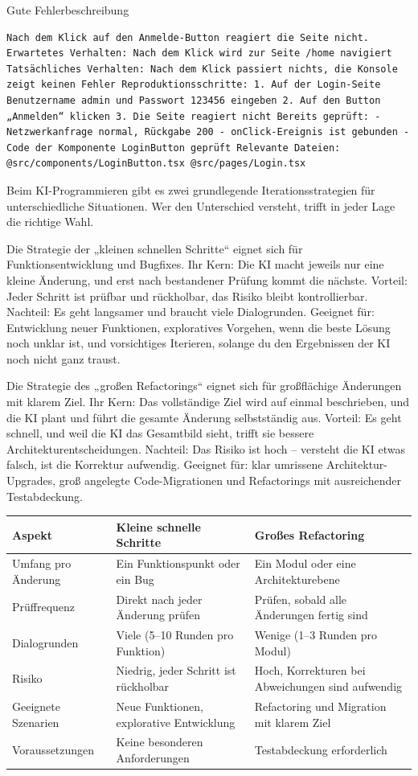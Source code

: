 Gute Fehlerbeschreibung

\begin{lstlisting}
Nach dem Klick auf den Anmelde-Button reagiert die Seite nicht. Erwartetes Verhalten: Nach dem Klick wird zur Seite /home navigiert Tatsächliches Verhalten: Nach dem Klick passiert nichts, die Konsole zeigt keinen Fehler Reproduktionsschritte: 1. Auf der Login-Seite Benutzername admin und Passwort 123456 eingeben 2. Auf den Button „Anmelden“ klicken 3. Die Seite reagiert nicht Bereits geprüft: - Netzwerkanfrage normal, Rückgabe 200 - onClick-Ereignis ist gebunden - Code der Komponente LoginButton geprüft Relevante Dateien: @src/components/LoginButton.tsx @src/pages/Login.tsx
\end{lstlisting}


Beim KI-Programmieren gibt es zwei grundlegende Iterationsstrategien für unterschiedliche Situationen. Wer den Unterschied versteht, trifft in jeder Lage die richtige Wahl.

Die Strategie der „kleinen schnellen Schritte“ eignet sich für Funktionsentwicklung und Bugfixes. Ihr Kern: Die KI macht jeweils nur eine kleine Änderung, und erst nach bestandener Prüfung kommt die nächste. Vorteil: Jeder Schritt ist prüfbar und rückholbar, das Risiko bleibt kontrollierbar. Nachteil: Es geht langsamer und braucht viele Dialogrunden. Geeignet für: Entwicklung neuer Funktionen, exploratives Vorgehen, wenn die beste Lösung noch unklar ist, und vorsichtiges Iterieren, solange du den Ergebnissen der KI noch nicht ganz traust.

Die Strategie des „großen Refactorings“ eignet sich für großflächige Änderungen mit klarem Ziel. Ihr Kern: Das vollständige Ziel wird auf einmal beschrieben, und die KI plant und führt die gesamte Änderung selbstständig aus. Vorteil: Es geht schnell, und weil die KI das Gesamtbild sieht, trifft sie bessere Architekturentscheidungen. Nachteil: Das Risiko ist hoch – versteht die KI etwas falsch, ist die Korrektur aufwendig. Geeignet für: klar umrissene Architektur-Upgrades, groß angelegte Code-Migrationen und Refactorings mit ausreichender Testabdeckung.

\begin{center}
\begin{tabularx}{\linewidth}{|X|X|X|}
\hline
\textbf{Aspekt} & \textbf{Kleine schnelle Schritte} & \textbf{Großes Refactoring} \tabularnewline
\hline
Umfang pro Änderung & Ein Funktionspunkt oder ein Bug & Ein Modul oder eine Architekturebene \tabularnewline
Prüffrequenz & Direkt nach jeder Änderung prüfen & Prüfen, sobald alle Änderungen fertig sind \tabularnewline
Dialogrunden & Viele (5–10 Runden pro Funktion) & Wenige (1–3 Runden pro Modul) \tabularnewline
Risiko & Niedrig, jeder Schritt ist rückholbar & Hoch, Korrekturen bei Abweichungen sind aufwendig \tabularnewline
Geeignete Szenarien & Neue Funktionen, explorative Entwicklung & Refactoring und Migration mit klarem Ziel \tabularnewline
Voraussetzungen & Keine besonderen Anforderungen & Testabdeckung erforderlich \tabularnewline
\hline
\end{tabularx}
\end{center}


